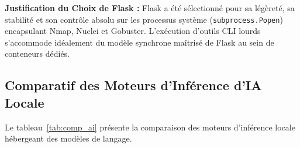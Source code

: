 \begin{table}[H]
\centering
\caption{Analyse Comparative des Frameworks de Microservices}
\label{tab:comp_micro}
%
\end{table}
\par \textbf{Justification du Choix de Flask :} Flask a \'et\'e s\'electionn\'e pour sa l\'eg\`eret\'e, sa stabilit\'e et son contr\^ole absolu sur les processus syst\`eme (\texttt{subprocess.Popen}) encapsulant Nmap, Nuclei et Gobuster. L'ex\'ecution d'outils CLI lourds s'accommode id\'ealement du mod\`ele synchrone ma\^itris\'e de Flask au sein de conteneurs d\'edi\'es.

\subsection{Comparatif des Moteurs d'Inf\'erence d'IA Locale}
\par Le tableau~\ref{tab:comp_ai} pr\'esente la comparaison des moteurs d'inf\'erence locale h\'ebergeant des mod\`eles de langage.


